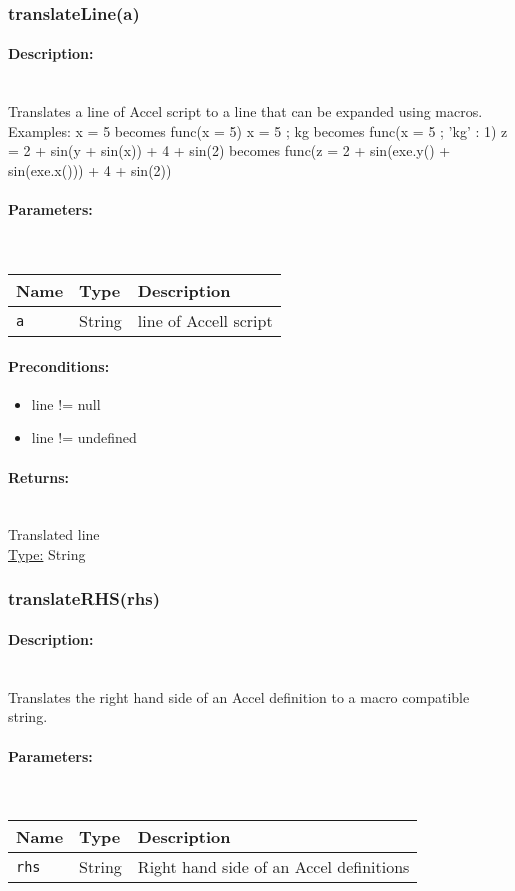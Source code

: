 \subsubsection{translateLine(a)} 
\paragraph{Description:} \hfill \\ 
Translates a line of Accel script to a line that can be expanded using macros.
Examples:
x = 5 becomes func(x = 5)
x = 5 ; kg becomes func(x = 5 ; {'kg' : 1})
z = 2 + sin(y + sin(x)) + 4 + sin(2) becomes func(z = 2 + sin(exe.y() + sin(exe.x())) + 4 + sin(2))
\paragraph{Parameters:} \hfill \\ 
\begin{tabular}{|l|l|l|}
\hline
\textbf{Name} & \textbf{Type} & \textbf{Description} \\ 
\hline
\texttt{a} & String & line of Accell script\\ 
\hline
\end{tabular}
\paragraph{Preconditions:} 
\begin{itemize}  
\item  line != null
\item  line != undefined
\end{itemize}  
\paragraph{Returns:} \hfill \\ 
Translated line\\ 
\underline{Type:} String
\subsubsection{translateRHS(rhs)} 
\paragraph{Description:} \hfill \\ 
Translates the right hand side of an Accel definition to a macro compatible string.
\paragraph{Parameters:} \hfill \\ 
\begin{tabular}{|l|l|l|}
\hline
\textbf{Name} & \textbf{Type} & \textbf{Description} \\ 
\hline
\texttt{rhs} & String & Right hand side of an Accel definitions\\ 
\hline
\end{tabular}
